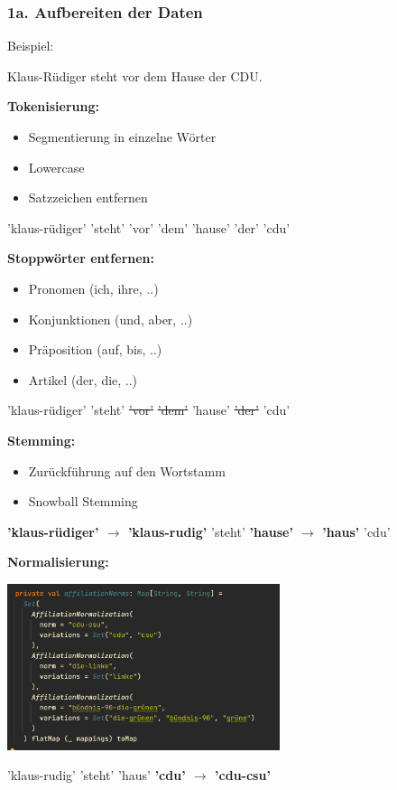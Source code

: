 \documentclass{beamer}
\begin{document}
\begin{frame}[allowframebreaks]
  \frametitle{1a. Aufbereiten der Daten}

  Beispiel:

  Klaus-Rüdiger steht vor dem Hause der CDU.

  \break

  \textbf{Tokenisierung:}

  \begin{itemize}
    \item Segmentierung in einzelne Wörter
    \item Lowercase
    \item Satzzeichen entfernen
  \end{itemize}

  \bigskip
  'klaus-rüdiger' 'steht' 'vor' 'dem' 'hause' 'der' 'cdu'

  \break

  \textbf{Stoppwörter entfernen:}

  \medskip

  {\scriptsize
    \begin{itemize}
      \item Pronomen (ich, ihre, ..)
      \item Konjunktionen (und, aber, ..)
      \item Präposition (auf, bis, ..)
      \item Artikel (der, die, ..)
    \end{itemize}
  }

  \bigskip

  'klaus-rüdiger' 'steht' \sout{'vor'} \sout{'dem'} 'hause' \sout{'der'} 'cdu'

  \break

  \textbf{Stemming:}

  \bigskip

  \begin{itemize}
    \item Zurückführung auf den Wortstamm
    \item Snowball Stemming
  \end{itemize}

  \bigskip

  \textbf{'klaus-rüdiger' $\rightarrow$ 'klaus-rudig'} 'steht' \textbf{'hause' $\rightarrow$ 'haus'} 'cdu'

  \break

  \textbf{Normalisierung:}

  \includegraphics[width=8cm]{normalisierung}

  \bigskip

  'klaus-rudig' 'steht' 'haus' \textbf{'cdu' $\rightarrow$ 'cdu-csu'}
\end{frame}
\end{document}
